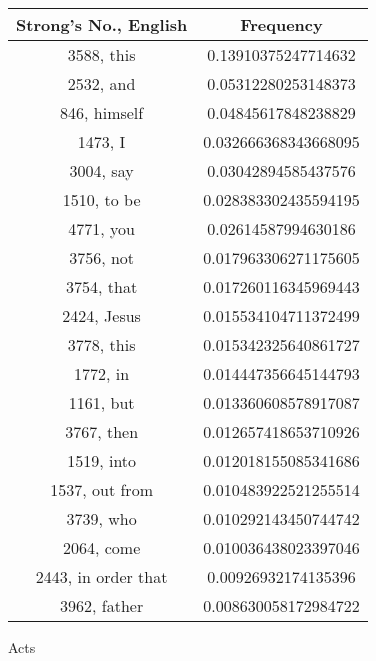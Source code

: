 \documentclass[12pt,letterpaper]{article}
\begin{document}
 \begin{longtable}{|c|c|}
\hline
 Strong's No., English & Frequency \\ \hline  
3588, this & 0.13910375247714632\\ \hline 
 2532, and & 0.05312280253148373\\ \hline 
 846, himself & 0.04845617848238829\\ \hline 
 1473, I & 0.032666368343668095\\ \hline 
 3004, say & 0.03042894585437576\\ \hline 
 1510, to be & 0.028383302435594195\\ \hline 
 4771, you & 0.02614587994630186\\ \hline 
 3756, not & 0.017963306271175605\\ \hline 
 3754, that & 0.017260116345969443\\ \hline 
 2424, Jesus & 0.015534104711372499\\ \hline 
 3778, this & 0.015342325640861727\\ \hline 
 1772, in & 0.014447356645144793\\ \hline 
 1161, but & 0.013360608578917087\\ \hline 
 3767, then & 0.012657418653710926\\ \hline 
 1519, into & 0.012018155085341686\\ \hline 
 1537, out from & 0.010483922521255514\\ \hline 
 3739, who & 0.010292143450744742\\ \hline 
 2064, come & 0.010036438023397046\\ \hline 
 2443, in order that & 0.00926932174135396\\ \hline 
 3962, father & 0.008630058172984722\\ \hline 
\end{longtable} 
 

Acts
\end{document}
